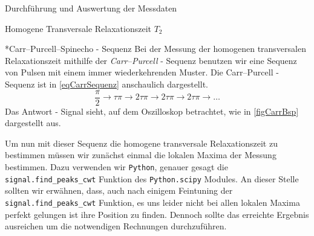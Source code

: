 \documentclass[pdftex, a4paper,11pt, twoside, ngerman]{report}
\begin{document}
\begin{chapter}{Durchführung und Auswertung der Messdaten}
\begin{section}{
        Homogene Transversale Relaxationszeit $T_{2}$}
\begin{subsection}
      \end{subsection}
      
      
      
      \begin{subsection}*{Carr--Purcell--Spinecho - Sequenz}
        \label{chpHomoTransRelaxCarr}
        Bei der Messung der homogenen transversalen Relaxationszeit mithilfe der
        \textit{Carr--Purcell} - Sequenz benutzen wir eine Sequenz von
        Pulsen mit einem immer wiederkehrenden Muster.
        Die Carr--Purcell - Sequenz ist in \cref{eqCarrSequenz} anschaulich
        dargestellt.
        \begin{equation}
          \label{eqCarrSequenz}
          \frac{\pi}{2} \rightarrow \tau\pi \rightarrow 2\tau\pi \rightarrow
          2\tau\pi \rightarrow 2\tau\pi \rightarrow \ldots
        \end{equation}
        Das Antwort - Signal sieht, auf dem Oszilloskop betrachtet, wie in
        \cref{figCarrBsp} dargestellt aus.
        
        Um nun mit dieser Sequenz die homogene transversale Relaxationszeit
        zu bestimmen müssen wir zunächst einmal die lokalen Maxima der Messung
        bestimmen.
        Dazu verwenden wir \texttt{Python}, genauer gesagt die
        \texttt{signal.find\_peaks\_cwt} Funktion des \texttt{Python.scipy}
        Modules.
        An dieser Stelle sollten wir erwähnen, dass, auch nach einigem
        Feintuning der \texttt{signal.find\_peaks\_cwt} Funktion, es uns leider
        nicht bei allen lokalen Maxima perfekt gelungen ist ihre Position zu
        finden.
        Dennoch sollte das erreichte Ergebnis ausreichen um die notwendigen
        Rechnungen durchzuführen.
        

\end{subsection}
\end{section}
\end{chapter}
\end{document}
